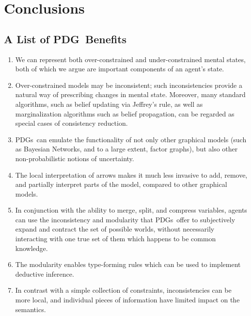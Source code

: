 \documentclass{article}
\newcommand{\MN}{PDG}
\newcommand{\MNs}{\MN s}
\begin{document}
	\section{Conclusions}
	\subsection{A List of \MN\ Benefits}\label{sec:list-of-benefits}
	\begin{enumerate}[nosep]
		\item We can represent both over-constrained and under-constrained mental states, both of which we argue are important components of an agent's state.
		\item Over-constrained models may be inconsistent; such inconsistencies provide a natural way of prescribing changes in mental state. Moreover, many standard algorithms, such as belief updating via Jeffrey's rule, as well as marginalization algorithms such as belief propagation, can be regarded as special cases of consistency reduction.
		\item \MNs\ can emulate the functionality of not only other graphical models (such as Bayesian Networks, and to a large extent, factor graphs), but also other non-probabilistic notions of uncertainty.
		\item The local interpretation of arrows makes it much less invasive to add, remove, and partially interpret parts of the model, compared to other graphical models.
		\item In conjunction with the ability to merge, split, and compress variables, agents can use the inconsistency and modularity that \MNs\ offer to subjectively expand and contract the set of possible worlds, without necessarily interacting with one true set of them which happens to be common knowledge. %
		\item The modularity enables type-forming rules which can be used to implement deductive inference.
		\item In contrast with a simple collection of constraints, inconsistencies can be more local, and individual pieces of information have limited impact on the semantics.
	\end{enumerate} %

	
	\onecolumn
	\appendix
\end{document}

